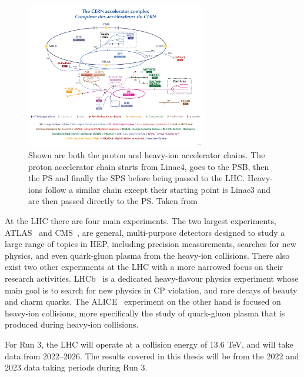 \begin{figure}[pht]
    \centering
    \includegraphics[width=0.7\textwidth]{figures/atlas/lhc_accelerator_chain.png}
    \caption{Shown are both the proton and heavy-ion accelerator chains. The proton accelerator chain starts from Linac4, goes to the PSB, then the PS and finally the SPS before being passed to the LHC\@. Heavy-ions follow a similar chain except their starting point is Linac3 and are then passed directly to the PS\@. Taken from~\cite{lhc_accelerator_chain_diagram}}\label{fig:lhc_accelerator_chain}
\end{figure}

At the LHC there are four main experiments. The two largest experiments, ATLAS~\cite{atlas_collaboration_paper} and CMS~\cite{cms_collaboration_paper}, are general, multi-purpose detectors designed to study a large range of topics in HEP, including precision measurements, searches for new physics, and even quark-gluon plasma from the heavy-ion collisions. There also exist two other experiments at the LHC with a more narrowed focus on their research activities. LHCb~\cite{lhcb_collaboration_paper} is a dedicated heavy-flavour physics experiment whose main goal is to search for new physics in CP violation, and rare decays of beauty and charm quarks. The ALICE~\cite{alice_collaboration_paper} experiment on the other hand is focused on heavy-ion collisions, more specifically the study of quark-gluon plasma that is produced during heavy-ion collisions. 

For Run 3, the LHC will operate at a \com{} collision energy of 13.6 TeV, and will take data from 2022--2026. The results covered in this thesis will be from the 2022 and 2023 data taking periods during Run 3.